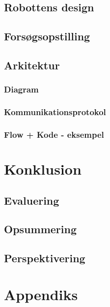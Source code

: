 \chapter{Robottens design}


\chapter{Forsøgsopstilling}

\chapter{Arkitektur}

\section{Diagram}
\section{Kommunikationsprotokol}\label{kommunikation}

\section{Flow + Kode - eksempel}

\part{Konklusion}
\chapter{Evaluering}
\chapter{Opsummering}
\chapter{Perspektivering}

\appendix
\part{Appendiks}



